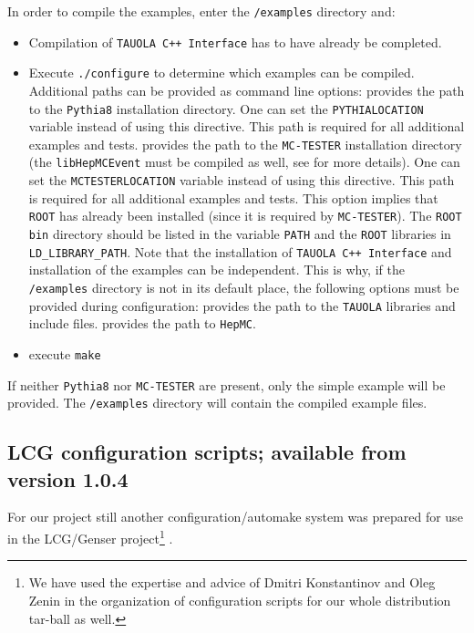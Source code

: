 \documentclass[]{Tauola_interface_design}
\begin{document}
In order to compile the examples, enter the {\tt /examples} directory and:
\begin{itemize}
  \item Compilation of {\tt TAUOLA C++ Interface} has to have already be completed.
  \item Execute {\tt ./configure} to determine which examples can be compiled. Additional paths can be provided as command line options:
    provides the path to the {\tt Pythia8} installation directory. One can set the {\tt PYTHIALOCATION} variable instead of using this directive. This path is required for all additional examples and tests.
    provides the path to the {\tt MC-TESTER} installation directory (the {\tt libHepMCEvent} must be compiled as well, see \cite{Davidson:2008ma} for more details). One can set the {\tt MCTESTERLOCATION} variable instead of using this directive. This path is required for all additional examples and tests.  This option implies that {\tt ROOT} has already been installed (since it is required by {\tt MC-TESTER}). The {\tt ROOT} {\tt bin} directory should be listed in the variable {\tt PATH}
and the {\tt ROOT} libraries in {\tt LD\_LIBRARY\_PATH}.
   \subitem Note that the installation of {\tt TAUOLA C++ Interface} and  installation of the examples
can be independent. This is why, if the {\tt /examples} directory is not in its default place,   the  
following options must be provided during configuration:
    provides the path to the {\tt TAUOLA} libraries and include files.
    provides the path to {\tt HepMC}.
  \item execute {\tt make}
\end{itemize}

If neither {\tt Pythia8} nor {\tt MC-TESTER} are present, only the simple example will be provided. The {\tt /examples} directory will contain the compiled example files.

\subsection{ LCG configuration scripts; available from version 1.0.4  }
\label{sec:autotools}

For our project still another configuration/automake system was
prepared for use in the LCG/Genser project\footnote{We have used the expertise and advice
of Dmitri Konstantinov and Oleg Zenin in the organization of configuration scripts
for our whole distribution tar-ball as well.} \cite{LCG,Kirsanov:2008zz}.
\end{document}
